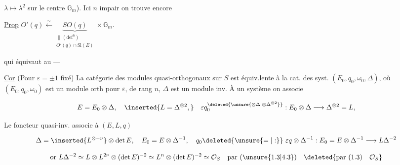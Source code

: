 
$\lambda\mapsto\lambda^2$ sur le centre $\mathbb G_m$). Ici  $n$ impair on trouve encore


\uline{Prop} $O'(q)\overset{\sim}{\longleftarrow}\underbrace{SO(q)}_{\substack{\parallel\,(\mathrm{def}^{\mathrm n})\\O'(q)\cap\mathrm{Sl}(E)}}\times\mathbb G_m$.

qui équivaut au ---

\uline{Cor} (Pour $\varepsilon=\pm1$ fixé) La catégorie des modules quasi-orthogonaux  sur $S$ est équiv.lente à la cat. des  syst. $(E_0,q_0,\omega_0,\Delta)$, où $(E_0,q_0,\omega_0)$ est un module  orth pour $\varepsilon$, de rang $n$, $\Delta$ est un module inv. À un système on associe


\[
 E=E_0\otimes\Delta,\quad\inserted{L=\Delta^{\otimes 2},}\quad
 \varepsilon q_0^{\deleted{\unsure{\otimes\Delta|\otimes\Delta^{\otimes2}}}}:E_0\otimes\Delta\longrightarrow\Delta^{\otimes 2}=L,
\]


Le foncteur quasi-inv. associe à $(E,L,q)$


\[
 \Delta=\inserted{L^{\otimes-\nu}}\otimes\det E,\quad
 E_0=E\otimes\Delta^{-1},\quad q_0\deleted{\unsure{=|:}}\ \varepsilon q\otimes\Delta^{-1}:E_0=E\otimes\Delta^{-1}\longrightarrow L\Delta^{-2}
\]

\[
 \text{or }L\Delta^{-2}\simeq L\otimes L^{2\nu}\otimes(\det E)^{-2}\simeq L^n\otimes(\det E)^{-2}\simeq\mathcal O_S
 \quad\text{par }(\unsure{1.3|4.3})\quad\deleted{\text{par }(1.3)\quad\mathcal O_S}
\]

